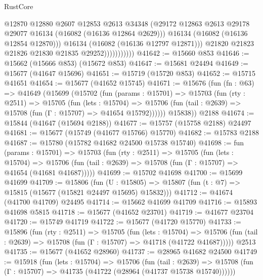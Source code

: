 \begin{lexlean}{RustCore}
\begin{coremodule}
                              @12870
                              @12880
                              @2607
                              @12853
                              @2613
                              @34348
                              (@29172
                                @12863
                                @2613
                                @29178
                                @29077
                                @16134
                                (@16082 (@16136 @12864 @2629)))
                              @16134
                              (@16082 (@16136 @12854 @12870)))
                            @16134
                            (@16082 (@16136 @12797 @12871)))
                          @21820
                          @21823
                          @21826
                          @21830
                          @21835
                          @29252)))))))))))
@41642 := @15660 @853
@41646 := @15662 (@15666 @853) (@15672 @853)
@41647 := @15681 @24494
@41649 := @15677 (@41647 @15696)
@41651 := @15719 (@15720 @853)
@41652 := @15715 @41651
@41654 := @15677 (@41652 @15745)
@41671 := @15676
    (fun (fn : @63) =>
    @41649
      (@15699
        (@15702
          (fun (params : @15701) =>
          @15703
            (fun (rty : @2511) =>
            @15705
              (fun (lets : @15704) =>
              @15706 (fun (tail : @2639) => @15708 (fun (Γ : @15707) => @41654 @15792))))))
        @15838))
    @2188
@41674 := @15844 (@41647 (@15694 @2188))
@41677 := @15757 (@15758 @2188) @24497
@41681 := @15677 (@15749 (@41677 @15766) @15770)
@41682 := @15783 @2188
@41687 := @15780 (@15782 @41682 @24500 @15738 @15740)
@41698 := fun (params : @15701) =>
  @15703
    (fun (rty : @2511) =>
    @15705
      (fun (lets : @15704) =>
      @15706 (fun (tail : @2639) => @15708 (fun (Γ : @15707) => @41654 (@41681 @41687)))))
@41699 := @15702 @41698
@41700 := @15699 @41699
@41709 := @15806
    (fun (U : @15805) => @15807 (fun (t : @7) => @15815 (@15677 (@15821 @24497 @15695) @15832)))
@41712 := @41674 (@41700 @41709) @24495
@41714 := @15662 @41699 @41709
@41716 := @15893 @41698 @5815
@41718 := @15677 (@41652 @23701)
@41719 := @41677 @23704
@41720 := @15749 @41719
@41722 := @15677 (@41720 @15770)
@41733 := @15896
    (fun (rty : @2511) =>
    @15705
      (fun (lets : @15704) =>
      @15706 (fun (tail : @2639) => @15708 (fun (Γ : @15707) => @41718 (@41722 @41687)))))
    @2513
@41735 := @15677 (@41652 @28960)
@41737 := @28965 @41682 @24500
@41749 := @15918
    (fun (lets : @15704) =>
    @15706
      (fun (tail : @2639) =>
      @15708 (fun (Γ : @15707) => @41735 (@41722 (@28964 (@41737 @15738 @15740))))))

\end{coremodule}
\end{lexlean}
